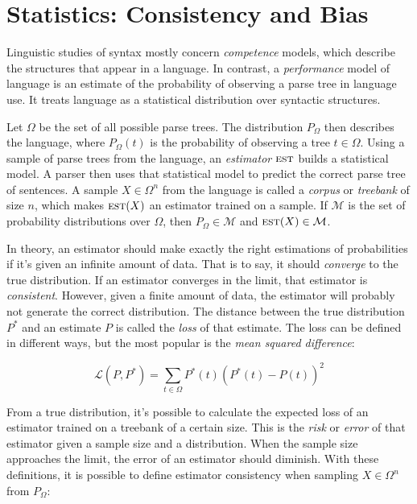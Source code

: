\section{Statistics: Consistency and Bias}\label{sec:Statistics}



Linguistic studies of syntax mostly concern \emph{competence} models, which describe the structures that appear in a language. In contrast, a \emph{performance} model of language is an estimate of the probability of observing a parse tree in language use. It treats language as a statistical distribution over syntactic structures.

Let $\Omega$ be the set of all possible parse trees. The distribution $P_\Omega$ then describes the language, where $P_\Omega(t)$ is the probability of observing a tree $t \in \Omega$. Using a sample of parse trees from the language, an \emph{estimator} $\textsc{est}$ builds a statistical model. A parser then uses that statistical model to predict the correct parse tree of sentences.
A sample $X \in \Omega^n$ from the language is called a \emph{corpus} or \emph{treebank} of size $n$, which makes $\textsc{est}(X)$ an estimator trained on a sample. If $\mathcal{M}$ is the set of probability distributions over $\Omega$, then $P_\Omega \in \mathcal{M}$ and $\textsc{est}(X) \in \mathcal{M}$.

In theory, an estimator should make exactly the right estimations of probabilities if it's given an infinite amount of data. That is to say, it should \emph{converge} to the true distribution. If an estimator converges in the limit, that estimator is \emph{consistent}.
However, given a finite amount of data, the estimator will probably not generate the correct distribution. The distance between the true distribution $P^*$ and an estimate $P$ is called the \emph{loss} of that estimate. The loss can be defined in different ways, but the most popular is the \emph{mean squared difference}:

$$ \mathcal{L}(P, P^*) =  \sum_{t \in \Omega} P^*(t) (P^*(t)-P(t))^2$$

From a true distribution, it's possible to calculate the expected loss of an estimator trained on a treebank of a certain size. This is the \emph{risk} or \emph{error} of that estimator given a sample size and a distribution. 
When the sample size approaches the limit, the error of an estimator should diminish. With these definitions, it is possible to define estimator consistency when sampling $X \in \Omega^n$ from $P_\Omega$:

